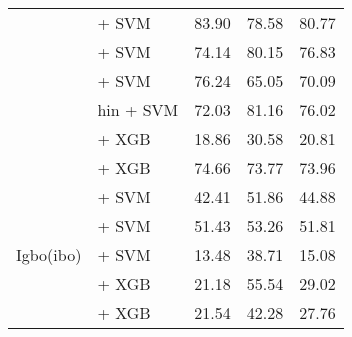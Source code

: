\begin{longtable}{llccc}
                                          & \citep{wang2024multilingual} + SVM                                     & 83.90                                & 78.58              & 80.77             \\
                                          & \citep{joshi2022l3cubemahasbert} + SVM                                 & 74.14                                & 80.15              & 76.83             \\
                                          & \citep{nogueira2019documentexpansionqueryprediction} + SVM             & 76.24                                & 65.05              & 70.09             \\
                                          & \citep{feng2020languageagnostic} hin + SVM                             & 72.03                                & 81.16              & 76.02             \\
                                          & \citep{all-MiniLM-L12-v2} + XGB                                        & 18.86                                & 30.58              & 20.81             \\
                                          & \citep{sturua2024jinaembeddingsv3multilingualembeddingstask} + XGB     & 74.66                                & 73.77              & 73.96             \\

    \midrule
    \multirow{5}{*}{Igbo(ibo)}            & \citep{feng2022languageagnosticbertsentenceembedding} + SVM            & 42.41                                & 51.86              & 44.88             \\
                                          & \citep{wang2024multilingual} + SVM                                     & 51.43                                & 53.26              & 51.81             \\
                                          & \citep{oketunji2024pmmlv2finetunedigbo} + SVM                          & 13.48                                & 38.71              & 15.08             \\
                                          & \citep{all-MiniLM-L12-v2} + XGB                                        & 21.18                                & 55.54              & 29.02             \\
                                          & \citep{sturua2024jinaembeddingsv3multilingualembeddingstask} + XGB     & 21.54                                & 42.28              & 27.76             \\


\end{longtable}
